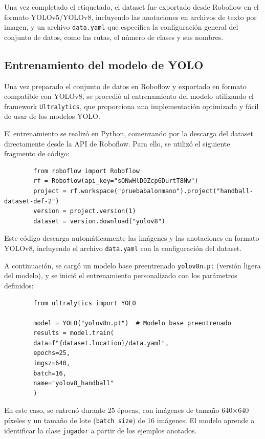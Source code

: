 \documentclass[12pt, a4paper, twoside]{article}
\begin{document}
	Una vez completado el etiquetado, el dataset fue exportado desde Roboflow en el formato YOLOv5/YOLOv8, incluyendo las anotaciones en archivos de texto por imagen, y un archivo \texttt{data.yaml} que especifica la configuración general del conjunto de datos, como las rutas, el número de clases y sus nombres.
	
	
	\subsection{Entrenamiento del modelo de YOLO}
	
	Una vez preparado el conjunto de datos en Roboflow y exportado en formato compatible con YOLOv8, se procedió al entrenamiento del modelo utilizando el framework \texttt{Ultralytics}, que proporciona una implementación optimizada y fácil de usar de los modelos YOLO.
	
	El entrenamiento se realizó en Python, comenzando por la descarga del dataset directamente desde la API de Roboflow. Para ello, se utilizó el siguiente fragmento de código:
	
	\begin{verbatim}
		from roboflow import Roboflow
		rf = Roboflow(api_key="sONwHlD0Zcp6DurtT8Nw")
		project = rf.workspace("pruebabalonmano").project("handball-dataset-def-2")
		version = project.version(1)
		dataset = version.download("yolov8")
	\end{verbatim}
	
	Este código descarga automáticamente las imágenes y las anotaciones en formato YOLOv8, incluyendo el archivo \texttt{data.yaml} con la configuración del dataset.
	
	A continuación, se cargó un modelo base preentrenado \texttt{yolov8n.pt} (versión ligera del modelo), y se inició el entrenamiento personalizado con los parámetros definidos:
	
	\begin{verbatim}
		from ultralytics import YOLO
		
		model = YOLO("yolov8n.pt")  # Modelo base preentrenado
		results = model.train(
		data=f"{dataset.location}/data.yaml",
		epochs=25,
		imgsz=640,
		batch=16,
		name="yolov8_handball"
		)
	\end{verbatim}
	
	En este caso, se entrenó durante 25 épocas, con imágenes de tamaño 640×640 píxeles y un tamaño de lote (\texttt{batch size}) de 16 imágenes. El modelo aprende a identificar la clase \texttt{jugador} a partir de los ejemplos anotados.
	
\end{document}
